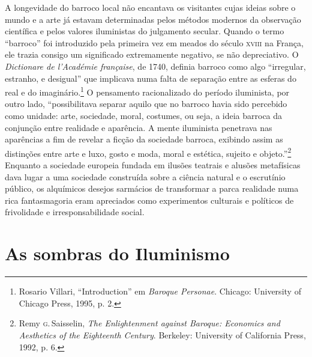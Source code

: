 A longevidade do barroco local não encantava os visitantes cujas ideias
sobre o mundo e a arte já estavam determinadas pelos métodos modernos da
observação científica e pelos valores iluministas do julgamento secular.
Quando o termo ``barroco'' foi introduzido pela primeira vez em meados
do século \textsc{xviii} na França, ele trazia consigo um significado extremamente
negativo, se não depreciativo. O \textit{Dictionare de l'Académie
française}, de 1740, definia barroco como algo ``irregular, estranho, 
e desigual'' que implicava numa falta de separação entre as
esferas do real e do imaginário.\footnote{Rosario Villari, ``Introduction'' em \textit{Baroque Personae}. Chicago: University of Chicago Press, 1995, p. 2.} O pensamento racionalizado do período iluminista, por outro lado, ``possibilitava
separar aquilo que no barroco havia sido percebido como unidade: arte,
sociedade, moral, costumes, ou seja, a ideia barroca da conjunção entre
realidade e aparência. A mente iluminista penetrava nas aparências a fim
de revelar a ficção da sociedade barroca, exibindo assim as distinções
entre arte e luxo, gosto e moda, moral e estética, sujeito e
objeto.''\footnote{Remy \textsc{g}.\,Saisselin, \textit{The Enlightenment against Baroque: Economics and Aesthetics of the Eighteenth Century}. Berkeley: University of California Press, 1992, p. 6.} Enquanto a sociedade europeia fundada em ilusões teatrais e alusões metafísicas
dava lugar a uma sociedade construída sobre a ciência natural e o
escrutínio público, os alquímicos desejos sarmácios de transformar a
parca realidade numa rica fantasmagoria eram apreciados como
experimentos culturais e políticos de frivolidade e irresponsabilidade
social.

\chapter{As sombras do Iluminismo}

\begin{epigraphs} 
\end{epigraphs}

